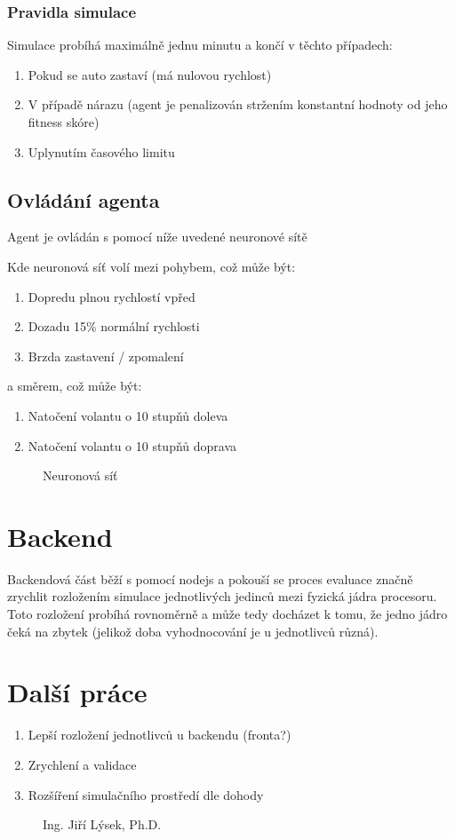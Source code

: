 \documentclass[a4paper,11pt,twoside]{article}
\begin{document}
	\subsubsection{Pravidla simulace}
	Simulace probíhá maximálně jednu minutu a končí v těchto případech:
	\begin{enumerate}
		\item Pokud se auto zastaví (má nulovou rychlost)
		\item V případě nárazu (agent je penalizován stržením konstantní hodnoty od jeho fitness skóre)
		\item Uplynutím časového limitu
    \end{enumerate}

	\subsection{Ovládání agenta}
	Agent je ovládán s pomocí níže uvedené neuronové sítě

	Kde neuronová síť volí mezi pohybem, což může být:
	\begin{enumerate}
		\item Dopredu plnou rychlostí vpřed
		\item Dozadu 15\% normální rychlosti
		\item Brzda zastavení / zpomalení
	\end{enumerate}
	a směrem, což může být:
	\begin{enumerate}
		\item Natočení volantu o 10 stupňů doleva
		\item Natočení volantu o 10 stupňů doprava
	\end{enumerate}
	\begin{figure}[!h]
		\centering
		\caption{Neuronová síť}
	\end{figure}
	\section{Backend}
	Backendová část běží s pomocí nodejs a pokouší se proces evaluace značně zrychlit rozložením simulace jednotlivých jedinců mezi fyzická jádra procesoru. Toto rozložení probíhá rovnoměrně a může tedy docházet k tomu, že jedno jádro čeká na zbytek (jelikož doba vyhodnocování je u jednotlivců různá).
	\section{Další práce}
	\begin{enumerate}
		\item Lepší rozložení jednotlivců u backendu (fronta?)
		\item Zrychlení a validace
		\item Rozšíření simulačního prostředí dle dohody
	\end{enumerate}
	\begin{figure}[!b]
		\flushright
		Ing. Jiří Lýsek, Ph.D.\hspace{0.5cm} \makebox[1.5in]{\hrulefill}
	\end{figure}
\end{document}

